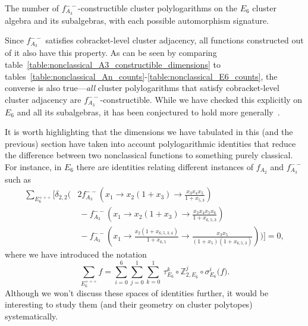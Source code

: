 \documentclass[12pt]{article}
\begin{document}
\begin{table}
\begin{center}
\end{center}

\caption{The number of $f_{A_3}^{--}$-constructible cluster polylogarithms on the $E_6$ cluster algebra and its subalgebras, with each possible automorphism signature.}
\label{table:nonclassical_A3_constructible_dimensions}
\end{table}

Since $f_{A_3}^{--}$ satisfies cobracket-level cluster adjacency, all functions constructed out of it also have this property. As can be seen by comparing table~\ref{table:nonclassical_A3_constructible_dimensions} to tables~\ref{table:nonclassical_An_counts}-\ref{table:nonclassical_E6_counts}, the converse is also true---\emph{all} cluster polylogarithms that satisfy cobracket-level cluster adjacency are $f_{A_3}^{--}$-constructible. While we have checked this explicitly on $E_6$ and all its subalgebras, it has been conjectured to hold more generally~\cite{Golden:2014xqa}. 

It is worth highlighting that the dimensions we have tabulated in this (and the previous) section have taken into account polylogarithmic identities that reduce the difference between two nonclassical functions to something purely classical. For instance, in $E_6$ there are identities relating different instances of $f_{A_2}$ and $f_{A_3}^{--}$ such as
\begin{align}
\sum_{E_6^{+++}} \Bigg[ \delta_{2,2}\Bigg(&2 f_{A_3}^{--}\left(x_1 \to x_2 (1 + x_3)\to \frac{x_3 x_4 x_5}{1 + x_{5,3}} \right)  \\
& \ - f_{A_3}^{--}\left(x_1\to x_2 (1 + x_3)\to \frac{x_3 x_4 x_5 x_6}{1 + x_{6,5,3}} \right) \nonumber  \\ 
&\ - f_{A_3}^{--}\left(x_1\to \frac{x_2 (1 + x_{6,5,3,4})}{1 + x_{6,5}}\to \frac{x_3 x_5}{(1 + x_5) (1 + x_{6,5,3})}\right)  \Bigg) \Bigg] = 0, \nonumber
\end{align}
where we have introduced the notation
\begin{equation}\label{eq:e6-symmetric-sum}
\sum_{E_6^{+++}} f = \sum_{i=0}^6\sum_{j=0}^1\sum_{k=0}^1 \ \tau_{E_6}^k \circ \mathbb{Z}_{2,E_6}^j \circ \sigma_{E_6}^i \big( f \big).
\end{equation}
Although we won't discuss these spaces of identities further, it would be interesting to study them (and their geometry on cluster polytopes) systematically. 
\end{document}
